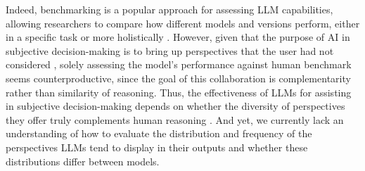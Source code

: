 Indeed, benchmarking is a popular approach for assessing LLM capabilities, allowing researchers to compare how different models and versions perform, either in a specific task or more holistically \cite{liang2023HELM}. However, given that the purpose of AI in subjective decision-making is to bring up perspectives that the user had not considered \cite{lai2021towards, ferguson2024just}, solely assessing the model's performance against human benchmark seems counterproductive, since the goal of this collaboration is complementarity rather than similarity of reasoning. Thus, the effectiveness of LLMs for assisting in subjective decision-making depends on whether the diversity of perspectives they offer truly complements human reasoning \cite{ferguson2024just, ferguson2023something}.
And yet, we currently lack an understanding of how to evaluate the distribution and frequency of the perspectives LLMs tend to display in their outputs \cite{frenda2024perspectivist} and whether these distributions differ between models.